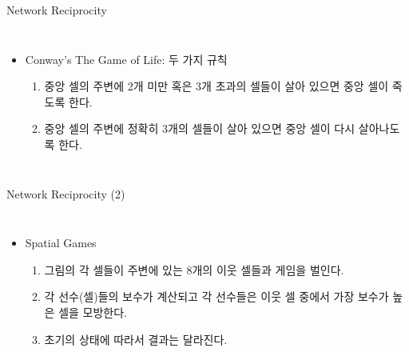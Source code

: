 \documentclass[final]{beamer}
\begin{document}
\begin{frame}[t]{Network Reciprocity}
	\begin{columns}[c]
	\column{20em}
	\begin{itemize}
	\item Conway's The Game of Life: 두 가지 규칙 
	 \begin{enumerate}
	\item 중앙 셀의 주변에 2개 미만 혹은 3개 초과의 셀들이 살아 있으면 중앙 셀이 죽도록 한다.
	\item 중앙 셀의 주변에 정확히 3개의 셀들이 살아 있으면 중앙 셀이 다시 살아나도록 한다. 
	\end{enumerate}
	\end{itemize}
	\column{12em}
	\end{columns}
\end{frame}

\begin{frame}[t]{Network Reciprocity (2)}
	\begin{columns}[c]
	\column{15em}
	\begin{itemize}
	\item Spatial Games
	 \begin{enumerate}
	\item 그림의 각 셀들이 주변에 있는 8개의 이웃 셀들과 게임을 벌인다. 
	\item 각 선수(셀)들의 보수가 계산되고 각 선수들은 이웃 셀 중에서 가장 보수가 높은 셀을 모방한다.
	\item 초기의 상태에 따라서 결과는 달라진다. 
	\end{enumerate}
	\end{itemize}
	\column{17em}
	\end{columns}
\end{frame}
\end{document}
